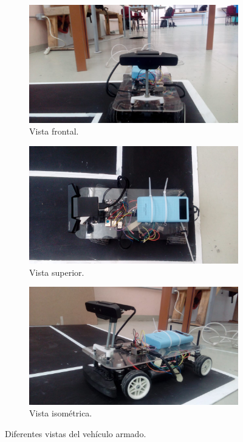 \begin{figure}[htbp!]
	\centering
	\begin{subfigure}[htbp!]{0.4\textwidth}
		\includegraphics[width=\textwidth]{./Figuras/CarroFron}
		\caption{Vista frontal.}
		\label{fig:fron}
	\end{subfigure}
	\begin{subfigure}[htbp!]{0.4\textwidth}
		\includegraphics[width=\textwidth]{./Figuras/CarroSup}
		\caption{Vista superior.}
		\label{fig:sup}
	\end{subfigure}
	\begin{subfigure}[htbp!]{0.4\textwidth}
		\includegraphics[width=\textwidth]{./Figuras/CarroIso}
		\caption{Vista isométrica.}
		\label{fig:iso}
	\end{subfigure}
	\caption{Diferentes vistas del vehículo armado.}
\end{figure}
